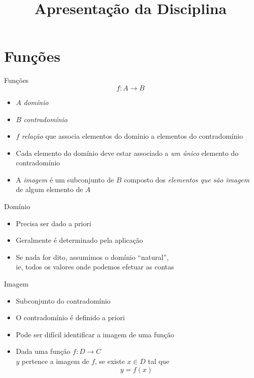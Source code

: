 
\usepackage{calculo_varias_variaveis-1}

\title{Apresentação da Disciplina}



\addtitle

\section{Funções}

\begin{frame}{Funções}
  \[
    f\colon A \to B
  \]
  \pause
  \vspace{-\baselineskip}
  \begin{itemize}[<+->]
    \item $A$ \emph{domínio}
    \item $B$ \emph{contradomínio}
    \item $f$ \emph{relação} que associa elementos do domínio a elementos do contradomínio
    \item Cada elemento do domínio deve estar associado a \emph{um único} elemento do contradomínio
    \item A \emph{imagem} é um subconjunto de $B$ composto dos \emph{elementos que são imagem} de algum elemento de $A$
  \end{itemize}
\end{frame}

\begin{frame}{Domínio}
  \begin{itemize}[<+->]
    \item Precisa ser dado a priori
    \item Geralmente é determinado pela aplicação
    \item Se nada for dito, assumimos o domínio ``natural'', \\
          ie, todos os valores onde podemos efetuar as contas
  \end{itemize}
\end{frame}

\begin{frame}{Imagem}
  \begin{itemize}[<+->]
    \item Subconjunto do contradomínio
    \item O contradomínio é definido a priori
    \item Pode ser difícil identificar a imagem de uma função
    \item Dada uma função \(f\colon D \to C \) \\
          $y$ pertence a imagem de $f$,
          se existe $x\in D$ tal que
          \[y=f(x)\]
  \end{itemize}
\end{frame}

